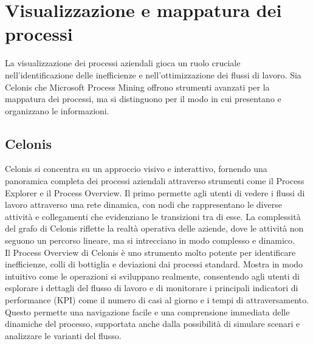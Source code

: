 \documentclass{article}
\begin{document}
\section{Visualizzazione e mappatura dei processi}
La visualizzazione dei processi aziendali gioca un ruolo cruciale nell'identificazione delle inefficienze e nell'ottimizzazione dei flussi di lavoro. Sia Celonis che Microsoft Process Mining offrono strumenti avanzati per la mappatura dei processi, ma si distinguono per il modo in cui presentano e organizzano le informazioni.

\subsection{Celonis}
Celonis si concentra su un approccio visivo e interattivo, fornendo una panoramica completa dei processi aziendali attraverso strumenti come il Process Explorer e il Process Overview. Il primo permette agli utenti di vedere i flussi di lavoro attraverso una rete dinamica, con nodi che rappresentano le diverse attività e collegamenti che evidenziano le transizioni tra di esse. La complessità del grafo di Celonis riflette la realtà operativa delle aziende, dove le attività non seguono un percorso lineare, ma si intrecciano in modo complesso e dinamico.\\
Il Process Overview di Celonis è uno strumento molto potente per identificare inefficienze, colli di bottiglia e deviazioni dai processi standard. Mostra in modo intuitivo come le operazioni si sviluppano realmente, consentendo agli utenti di esplorare i dettagli del flusso di lavoro e di monitorare i principali indicatori di performance (KPI) come il numero di casi al giorno e i tempi di attraversamento. Questo permette una navigazione facile e una comprensione immediata delle dinamiche del processo, supportata anche dalla possibilità di simulare scenari e analizzare le varianti del flusso.
\end{document}
